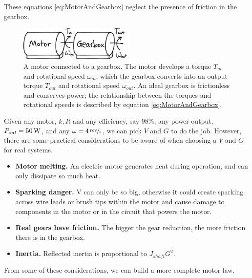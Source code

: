 These equations \ref{eq:MotorAndGearbox} neglect the presence of friction in the gearbox.

\begin{figure}[h]		%
\begin{centering}
\includegraphics[width=0.5\textwidth]{Figures/MotorAndGearbox}\par
\end{centering}
\caption[Diagram: Motor Connected to a Gearbox]{A motor connected to a gearbox. The motor develops a torque $T_{m}$ and rotational speed $\omega_{m}$, which the gearbox converts into an output torque $T_{out}$ and rotational speed $\omega_{out}$. An ideal gearbox is frictionless and conserves power; the relationship between the torques and rotational speeds is described by equation \ref{eq:MotorAndGearbox}.}
\label{fig:MotorAndGearbox}
\end{figure}
%

Given any motor, $k, R$ and any efficiency, say 98\%, any power output, $P_{out}=\unit[50]{W}$, and any $\omega=\unitfrac[4]{rev}{s}$, we can pick $V$ and $G$ to do the job. However, there are some practical considerations to be aware of when choosing a $V$ and $G$ for real systems.  

\begin{itemize}

\item \textbf{Motor melting.} An electric motor generates heat during operation, and can only dissipate so much heat. 
\item \textbf{Sparking danger.} V can only be so big, otherwise it could create sparking across wire leads or brush tips within the motor and cause damage to components in the motor or in the circuit that powers the motor.
\item \textbf{Real gears have friction.} The bigger the gear reduction, the more friction there is in the gearbox.
\item \textbf{Inertia.} Reflected inertia is proportional to $J_{shaft}G^{2}$.

\end{itemize}

From some of these considerations, we can build a more complete motor law.

